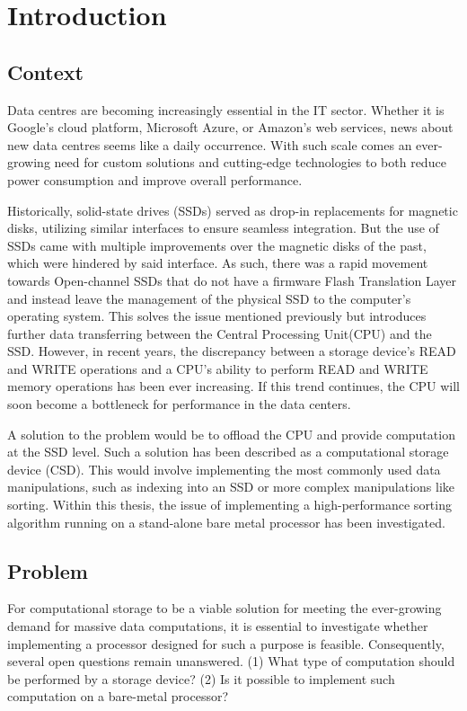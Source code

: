\section{Introduction}
\subsection{Context}\label{sec:context}
Data centres are becoming increasingly essential in the IT sector. Whether it is
Google's cloud platform, Microsoft Azure, or Amazon's web services, news about
new data centres seems like a daily occurrence. With such scale comes an
ever-growing need for custom solutions and cutting-edge technologies to both
reduce power consumption and improve overall performance.

Historically, solid-state drives (SSDs) served as drop-in replacements for
magnetic disks, utilizing similar interfaces to ensure seamless integration. But
the use of SSDs came with multiple improvements over the magnetic disks of the
past, which were hindered by said interface. As such, there was a rapid movement
towards Open-channel SSDs that do not have a firmware Flash Translation Layer
and instead leave the management of the physical SSD to the computer's operating
system. This solves the issue mentioned previously but introduces further data
transferring between the Central Processing Unit(CPU) and the SSD. However, in
recent years, the discrepancy between a storage device's READ and WRITE
operations and a CPU's ability to perform READ and WRITE memory operations has
been ever increasing. If this trend continues, the CPU will soon become a
bottleneck for performance in the data centers.

A solution to the problem would be to offload the CPU and provide computation at
the SSD level. Such a solution has been described as a computational storage
device (CSD). This would involve implementing the most commonly used data
manipulations, such as indexing into an SSD or more complex manipulations like
sorting. Within this thesis, the issue of implementing a high-performance
sorting algorithm running on a stand-alone bare metal processor has been
investigated.


\subsection{Problem}
For computational storage to be a viable solution for meeting the ever-growing
demand for massive data computations, it is essential to investigate whether
implementing a processor designed for such a purpose is feasible. Consequently,
several open questions remain unanswered. (1) What type of computation should be
performed by a storage device? (2) Is it possible to implement such computation
on a bare-metal processor?

